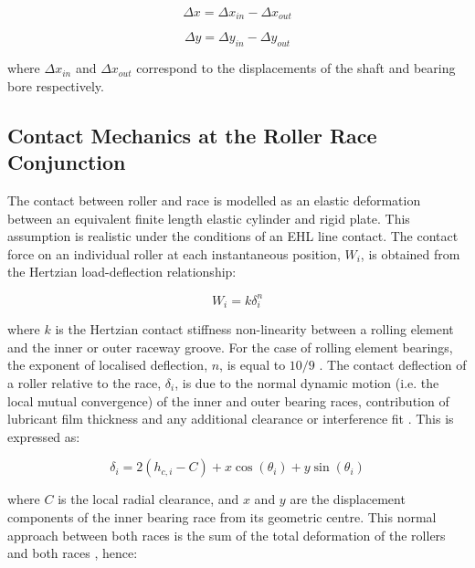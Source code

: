 \begin{equation}\label{relativdispaccelx}
	\Delta x = \Delta x_{in} - \Delta x_{out}
\end{equation}

\begin{equation}\label{relativdispaccely}
	\Delta y = \Delta y_{in} - \Delta y_{out}
\end{equation}

where $\Delta x_{in}$ and $\Delta x_{out}$ correspond to the displacements of the shaft and bearing bore respectively. 

\subsection{Contact Mechanics at the Roller Race Conjunction} \label{Contact mechanics experimental tribodynamics}

The contact between roller and race is modelled as an elastic deformation between an equivalent finite length elastic cylinder and rigid plate. This assumption is realistic under the conditions of an EHL line contact. The contact force on an individual roller at each instantaneous position, $W_i$, is obtained from the Hertzian load-deflection relationship:

\begin{equation}\label{Hertz load deflection}
	W_i=k \delta_i^n
\end{equation}

where $k$ is the Hertzian contact stiffness non-linearity between a rolling element and the inner or outer raceway groove. For the case of rolling element bearings, the exponent of localised deflection, $n$, is equal to $10/9$ \cite{Harris1984}. The contact deflection of a roller relative to the race, $\delta_i$, is due to the normal dynamic motion (i.e. the local mutual convergence) of the inner and outer bearing races, contribution of lubricant film thickness and any additional clearance or interference fit \cite{Mohammadpour2015c}. This is expressed as:

\begin{equation}\label{Contact deflection experimental}
	\delta_i=2\left(h_{c,i}-C\right)+x\cos{\left(\theta_i\right)}+y\sin(\theta_i)
\end{equation}

where $C$ is the local radial clearance, and $x$ and $y$ are the displacement components of the inner bearing race from its geometric centre. This normal approach between both races is the sum of the total deformation of the rollers and both races \cite{Hamrock1981}, hence:

